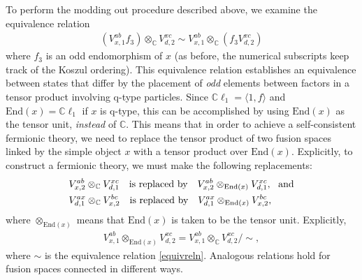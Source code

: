 \documentclass[12pt,a4paper]{article}
\newcommand{\tp}{\otimes}
\newcommand{\unit}{\mathds{1}}
\newcommand{\cc}{\mathbb{C}}
\newcommand\be            {\begin{equation}}
\newcommand\ee            {\end{equation}}
\newcommand\ba            {\begin{aligned}}
\newcommand\ea            {\end{aligned}}
\newcommand{\End}{\text{End}}
\newcommand{\cl}{\mathbb{C}\ell}
\begin{document}
To perform the modding out procedure described above, we examine the 
equivalence relation 
\begin{align} \label{equivreln}
(V^{ab}_{x,1} f_3) \tp_{\mathbb{C}}V^{xc}_{d,2} \sim V^{ab}_{x,1} \tp_{\mathbb{C}} (f_3 V^{xc}_{d,2})
\end{align}
where $f_3$ is an odd endomorphism of $x$ (as before, the numerical subscripts keep track of the Koszul ordering).%
This equivalence relation establishes an equivalence between states that differ by the placement of {\it odd} elements between factors in a tensor product involving q-type particles. 
Since $\cl_1 = \langle1,f\rangle$ and $\End(x) = \cl_1$ if $x$ is q-type, this can be accomplished by using $\End(x)$ as the tensor unit, {\it instead} of $\cc$. 
This means that in order to achieve a self-consistent fermionic theory, we need to replace the tensor product of two fusion spaces linked by the simple object $x$ with a tensor product over $\End(x)$. 
 Explicitly, to construct a fermionic theory, we must make the following replacements:
\be \ba
 &V^{ab}_{x,2} \tp_{\mathbb{C}} V^{xc}_{d,1}\quad  \text{is replaced by} \quad V^{ab}_{x,2} \tp_{\text{End}(x)} V^{xc}_{d,1},\ \  {\rm and} \\ 
  &V^{ax}_{d,1} \tp_{\mathbb{C}} V^{bc}_{x,2}\quad  \text{is replaced by} \quad V^{ax}_{d,1} \tp_{\End(x)} V^{bc}_{x,2},
\ea 
\ee
where $\tp_{\End(x)}$ means that $\End(x)$ is taken to be the tensor unit. Explicitly, %
\begin{align}
V^{ab}_{x,1} \tp_{\text{End}(x)} V^{xc}_{d,2} = V^{ab}_{x,1} \tp_{\mathbb{C}}V^{xc}_{d,2}/ \sim,
\label{qtensor}
\end{align}
where $\sim$ is the equivalence relation \eqref{equivreln}. 
Analogous relations hold for fusion spaces connected in different ways. 
\end{document}
